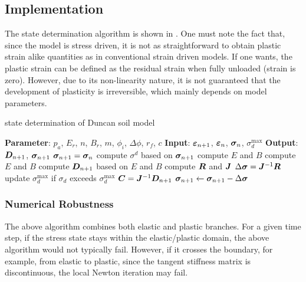 \subsection{Implementation}
The state determination algorithm is shown in .
One must note the fact that, since the model is stress driven, it is not as straightforward to obtain plastic strain alike quantities as in conventional strain driven models.
If one wants, the plastic strain can be defined as the residual strain when fully unloaded (strain is zero).
However, due to its non-linearity nature, it is not guaranteed that the development of plasticity is irreversible, which mainly depends on model parameters.
\begin{breakablealgorithm}
\caption{state determination of Duncan soil model}\label{algo:duncan_model}
\begin{algorithmic}
\State \textbf{Parameter}: $p_a$, $E_r$, $n$, $B_r$, $m$, $\phi_i$, $\Delta\phi$, $r_f$, $c$
\State \textbf{Input}: $\bm{\varepsilon}_{n+1}$, $\bm{\varepsilon}_n$, $\bm{\sigma}_n$, $\sigma_d^{\text{max}}$
\State \textbf{Output}: $\bm{D}_{n+1}$, $\bm{\sigma}_{n+1}$
\State $\bm{\sigma}_{n+1}=\bm{\sigma}_n$
\State compute $\sigma^d$ based on $\bm{\sigma}_{n+1}$
\State compute $E$ and $B$
\Else
\State compute $E$ and $B$
\EndIf
\State compute $\bm{D}_{n+1}$ based on $E$ and $B$
\State compute $\bm{R}$ and $\bm{J}$
\State $\Delta\bm{\sigma}=\bm{J}^{-1}\bm{R}$
\State update $\sigma_d^{\text{max}}$ if $\sigma_d$ exceeds $\sigma_d^{\text{max}}$
\State $\bm{C}=\bm{J}^{-1}\bm{D}_{n+1}$
\State \Return
\EndIf
\State $\bm{\sigma}_{n+1}\leftarrow\bm{\sigma}_{n+1}-\Delta\bm{\sigma}$
\EndWhile
\end{algorithmic}
\end{breakablealgorithm}
\subsubsection{Numerical Robustness}
The above algorithm combines both elastic and plastic branches. For a given time step, if the stress state stays within the elastic/plastic domain, the above algorithm would not typically fail. However, if it crosses the boundary, for example, from elastic to plastic, since the tangent stiffness matrix is discontinuous, the local Newton iteration may fail.

